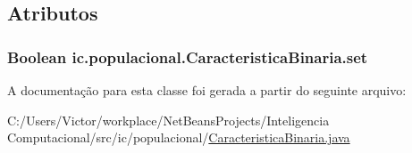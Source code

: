 \subsection{Atributos}
\hypertarget{classic_1_1populacional_1_1_caracteristica_binaria_aa0cb4f115639d971f6b6d24dba1d2e15}{
\subsubsection[{set}]{\setlength{\rightskip}{0pt plus 5cm}Boolean ic.\-populacional.\-Caracteristica\-Binaria.\-set\hspace{0.3cm}{\ttfamily [private]}}}\label{classic_1_1populacional_1_1_caracteristica_binaria_aa0cb4f115639d971f6b6d24dba1d2e15}


A documentação para esta classe foi gerada a partir do seguinte arquivo\-:\begin{DoxyCompactItemize}
\item 
C\-:/\-Users/\-Victor/workplace/\-Net\-Beans\-Projects/\-Inteligencia Computacional/src/ic/populacional/\hyperlink{_caracteristica_binaria_8java}{Caracteristica\-Binaria.\-java}\end{DoxyCompactItemize}
